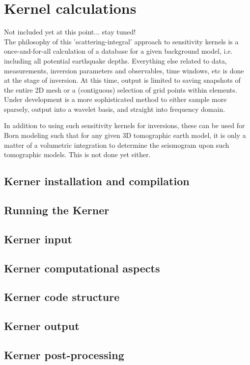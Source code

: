 \documentclass[11pt,letter,fleqn,english,notitlepage]{article}
\begin{document}
\section{Kernel calculations}
Not included yet at this point... stay tuned!\\

\noindent The philosophy of this 'scattering-integral' approach to sensitivity kernels 
is a once-and-for-all calculation of a database for a given background model,
i.e. including all potential earthquake depths. Everything else related to 
data, measurements, inversion parameters and observables, time windows, etc 
is done at the stage of inversion. At this time, output is limited to 
saving snapshots of the entire 2D mesh or a (contiguous) selection of grid points 
within elements. Under development is a more 
sophisticated method to either sample more sparsely, output into a wavelet 
basis, and straight into frequency domain. 

In addition to using such sensitivity kernels for inversions, 
these can be used for Born modeling such that for any given 3D tomographic earth model, 
it is only a matter of a volumetric integration to determine the seismogram upon such tomographic 
models. This is not done yet either.

\subsection{Kerner installation and compilation}
\subsection{Running the Kerner}
\subsection{Kerner input}
\subsection{Kerner computational aspects}
\subsection{Kerner code structure}
\subsection{Kerner output}
\subsection{Kerner post-processing}
\end{document}
